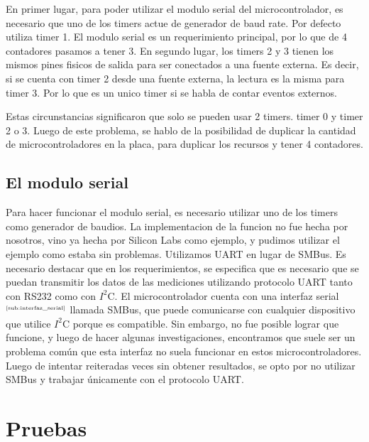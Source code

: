 En primer lugar, para poder utilizar el modulo serial del microcontrolador, es necesario que uno de los timers actue de generador de baud rate. Por defecto utiliza timer 1. El modulo serial es un requerimiento principal, por lo que de 4 contadores pasamos a tener 3. En segundo lugar, los timers 2 y 3 tienen los mismos pines fisicos de salida para ser conectados a una fuente externa. Es decir, si se cuenta con timer 2 desde una fuente externa, la lectura es la misma para timer 3. Por lo que es un unico timer si se habla de contar eventos externos.

Estas circunstancias significaron que solo se pueden usar 2 timers. timer 0 y timer 2 o 3. Luego de este problema, se hablo de la posibilidad de duplicar la cantidad de microcontroladores en la placa, para duplicar los recursos y tener 4 contadores.


\subsection{El modulo serial} %
\label{sub:el_modulo_serial}

Para hacer funcionar el modulo serial, es necesario utilizar uno de los timers como generador de baudios. La implementacion de la funcion no fue hecha por nosotros, vino ya hecha por Silicon Labs como ejemplo, y pudimos utilizar el ejemplo como estaba sin problemas. Utilizamos UART en lugar de SMBus. Es necesario destacar que en los requerimientos, se especifica que es necesario que se puedan transmitir los datos de las mediciones utilizando protocolo UART tanto con RS232 como con $I^{2}$C. El microcontrolador cuenta con una interfaz serial$^{\tiny{\ref{sub:interfaz_serial}}}$ llamada SMBus, que puede comunicarse con cualquier dispositivo que utilice $I^{2}$C porque es compatible. Sin embargo, no fue posible lograr que funcione, y luego de hacer algunas investigaciones, encontramos que suele ser un problema común que esta interfaz no suela funcionar en estos microcontroladores. Luego de intentar reiteradas veces sin obtener resultados, se opto por no utilizar SMBus y trabajar únicamente con el protocolo UART.



\section{Pruebas} %
\label{sec:pruebas}


